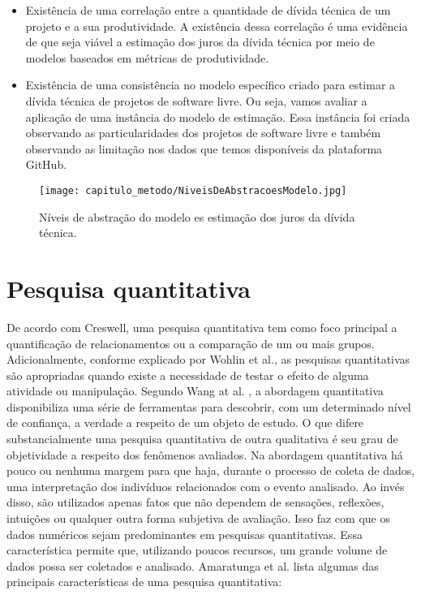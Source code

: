 \begin{itemize}
\item Existência de uma correlação entre a quantidade de dívida técnica de um projeto e a sua produtividade.  A existência dessa correlação é uma evidência de que seja viável a estimação dos juros da dívida técnica por meio de modelos baseados em métricas de produtividade. 
\item Existência de uma consistência no modelo específico criado para estimar a dívida técnica de projetos de software livre. Ou seja, vamos avaliar a aplicação de uma instância do modelo de estimação. Essa instância foi criada observando as particularidades dos projetos de software livre e também observando as limitação nos dados que temos disponíveis da plataforma GitHub.
\end{itemize} 



  \begin{figure}[H]
  \centering
  \texttt{[image: capitulo\_metodo/NiveisDeAbstracoesModelo.jpg]} 
  \caption{Níveis de abstração do modelo es estimação dos juros da dívida técnica. }
  \label{fig:cap_metodo_niveis_abstracao} 
\end{figure}




\section{Pesquisa quantitativa}




De acordo com Creswell\cite{w2016research}, uma pesquisa quantitativa tem como foco principal a quantificação de relacionamentos ou a comparação de um ou mais grupos. Adicionalmente, conforme explicado por Wohlin et al.\cite{wohlin2003empirical}, as pesquisas quantitativas são apropriadas quando existe a necessidade de testar o efeito de alguma atividade ou manipulação. Segundo Wang at al. \cite{wang201331}, a abordagem quantitativa disponibiliza uma série de ferramentas para descobrir, com um determinado nível de confiança, a verdade a respeito de um objeto de estudo. O que difere substancialmente uma pesquisa quantitativa de outra qualitativa é seu grau de  objetividade a respeito dos fenômenos avaliados. Na abordagem quantitativa há pouco ou nenhuma margem para que haja, durante o processo de coleta de dados, uma interpretação dos indivíduos relacionados com o evento analisado. Ao invés disso, são utilizados apenas fatos que não dependem de sensações, reflexões, intuições ou qualquer outra forma subjetiva de avaliação. Isso faz com que os dados numéricos sejam predominantes em pesquisas quantitativas.  Essa característica permite que, utilizando poucos recursos, um grande volume de dados possa ser coletados e analisado.  Amaratunga et al. \cite{amaratunga2002quantitative} lista algumas das principais características de uma pesquisa quantitativa:

